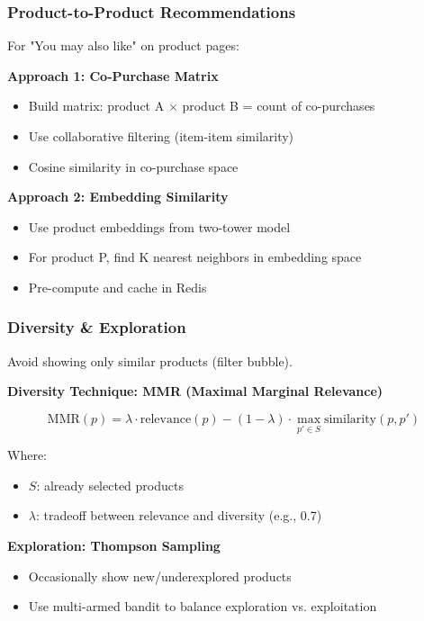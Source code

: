 \documentclass[11pt,letterpaper]{article}
\begin{document}
\subsubsection{Product-to-Product Recommendations}

For "You may also like" on product pages:

\textbf{Approach 1: Co-Purchase Matrix}
\begin{itemize}
    \item Build matrix: product A $\times$ product B = count of co-purchases
    \item Use collaborative filtering (item-item similarity)
    \item Cosine similarity in co-purchase space
\end{itemize}

\textbf{Approach 2: Embedding Similarity}
\begin{itemize}
    \item Use product embeddings from two-tower model
    \item For product P, find K nearest neighbors in embedding space
    \item Pre-compute and cache in Redis
\end{itemize}

\subsubsection{Diversity \& Exploration}

Avoid showing only similar products (filter bubble).

\textbf{Diversity Technique: MMR (Maximal Marginal Relevance)}

\begin{equation}
\text{MMR}(p) = \lambda \cdot \text{relevance}(p) - (1 - \lambda) \cdot \max_{p' \in S} \text{similarity}(p, p')
\end{equation}

Where:
\begin{itemize}
    \item $S$: already selected products
    \item $\lambda$: tradeoff between relevance and diversity (e.g., 0.7)
\end{itemize}

\textbf{Exploration: Thompson Sampling}
\begin{itemize}
    \item Occasionally show new/underexplored products
    \item Use multi-armed bandit to balance exploration vs. exploitation
\end{itemize}
\end{document}
